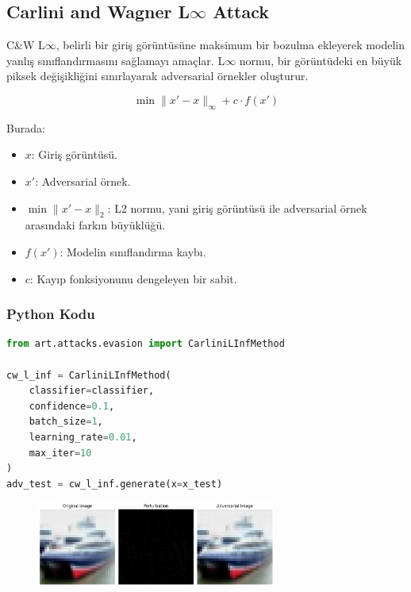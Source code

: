 \subsection{Carlini and Wagner L$\infty$ Attack}

C\&W L$\infty$, belirli bir giriş görüntüsüne maksimum bir bozulma ekleyerek modelin yanlış sınıflandırmasını sağlamayı amaçlar. L$\infty$ normu, bir görüntüdeki en büyük piksek değişikliğini sınırlayarak adversarial örnekler oluşturur. 

\[ \min \|x' - x\|_\infty + c \cdot f(x') \]

Burada:

\begin{itemize}
    \item $x$: Giriş görüntüsü.
    \item $x'$: Adversarial örnek.
    \item $\min \|x' - x\|_2$: L2 normu, yani giriş görüntüsü ile adversarial örnek arasındaki farkın büyüklüğü.
    \item $f(x')$: Modelin sınıflandırma kaybı.
    \item $c$: Kayıp fonksiyonunu dengeleyen bir sabit.
\end{itemize}

\subsubsection{Python Kodu}

\begin{lstlisting}[language=Python]
from art.attacks.evasion import CarliniLInfMethod

cw_l_inf = CarliniLInfMethod(
    classifier=classifier, 
    confidence=0.1, 
    batch_size=1, 
    learning_rate=0.01, 
    max_iter=10
)
adv_test = cw_l_inf.generate(x=x_test)
\end{lstlisting}

\begin{figure}[h]
    \centering
    \includegraphics[width=0.7\textwidth]{images/cw_l_inf_results.png}
    \caption{}
\end{figure}

\newpage

